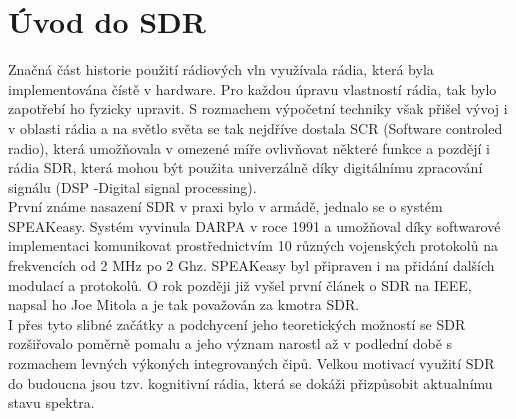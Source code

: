 \documentclass{ctuthesis}
\begin{document}
\section{Úvod do SDR} 
Značná část historie použití rádiových vln využívala rádia, která byla implementována čístě v hardware. Pro každou úpravu  vlastností rádia, tak bylo zapotřebí ho fyzicky upravit. S rozmachem výpočetní techniky však přišel vývoj i v oblasti rádia a na světlo světa se tak nejdříve dostala SCR (Software controled radio), která umožňovala v omezené míře ovlivňovat některé funkce a pozdějí i rádia SDR, která mohou být použita univerzálně díky digitálnímu zpracování signálu (DSP -Digital signal processing). \\
První známe nasazení SDR v praxi bylo v armádě, jednalo se o systém SPEAKeasy. Systém vyvinula DARPA v roce 1991 a umožňoval díky softwarové implementaci komunikovat prostřednictvím 10 různých vojenských protokolů na frekvencích od 2 MHz po 2 Ghz. SPEAKeasy byl připraven i na přidání dalších modulací a protokolů. O rok později již vyšel první článek o SDR na IEEE, napsal ho Joe Mitola a je tak považován za kmotra SDR. \cite{sdrHistory2010}\\
I přes tyto slibné začátky a podchycení jeho teoretických možností se SDR rozšiřovalo poměrně pomalu a jeho význam narostl až v podlední době s rozmachem levných výkoných integrovaných čipů. Velkou motivací využití SDR do budoucna jsou tzv. kognitivní rádia, která se dokáži přizpůsobit aktualnímu stavu spektra.
\end{document}
